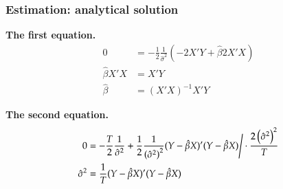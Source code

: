 \documentclass[notes,blackandwhite,mathsans]{beamer}
\begin{document}
\begin{frame}
\frametitle{Estimation: analytical solution}

\textbf{The first equation.}
\begin{align*}
0 &= -\frac{1}{2}\frac{1}{\hat\sigma^2}\left( -2X'Y + \hat\beta 2X'X \right)  \\
\hat\beta X'X  &= X'Y\\
\hat\beta &= (X'X)^{-1}X'Y
\end{align*}


\bigskip\textbf{The second equation.}
\begin{align*}
0 &= -\frac{T}{2}\frac{1}{\hat\sigma^2} + \frac{1}{2}\frac{1}{\left(\hat\sigma^2\right)^2}(Y-\hat\beta X)'(Y-\hat\beta X) \Bigg\slash \cdot\frac{2\left( \hat\sigma^2\right)^2}{T} \\
\hat\sigma^2 &= \frac{1}{T}(Y-\hat\beta X)'(Y-\hat\beta X)
\end{align*}

\end{frame}
\end{document}
